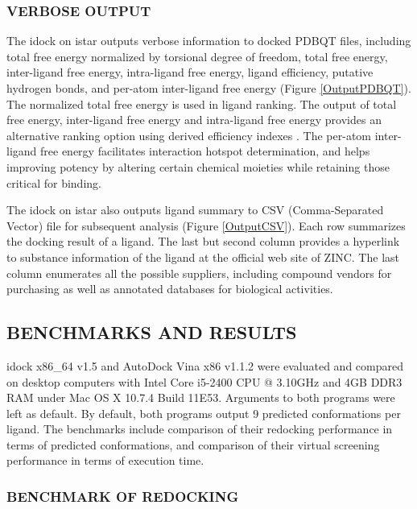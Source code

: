 \documentclass[12pt]{article}
\begin{document}
\subsubsection*{\sffamily \normalsize VERBOSE OUTPUT}

The idock on istar outputs verbose information to docked PDBQT files, including total free energy normalized by torsional degree of freedom, total free energy, inter-ligand free energy, intra-ligand free energy, ligand efficiency, putative hydrogen bonds, and per-atom inter-ligand free energy (Figure \ref{OutputPDBQT}). The normalized total free energy is used in ligand ranking. The output of total free energy, inter-ligand free energy and intra-ligand free energy provides an alternative ranking option using derived efficiency indexes \citep{335,336,337}. The per-atom inter-ligand free energy facilitates interaction hotspot determination, and helps improving potency by altering certain chemical moieties while retaining those critical for binding.

The idock on istar also outputs ligand summary to CSV (Comma-Separated Vector) file for subsequent analysis (Figure \ref{OutputCSV}). Each row summarizes the docking result of a ligand. The last but second column provides a hyperlink to substance information of the ligand at the official web site of ZINC. The last column enumerates all the possible suppliers, including compound vendors for purchasing as well as annotated databases for biological activities.

\subsection*{\sffamily \large BENCHMARKS AND RESULTS}

idock x86\_64 v1.5 and AutoDock Vina x86 v1.1.2 were evaluated and compared on desktop computers with Intel Core i5-2400 CPU @ 3.10GHz and 4GB DDR3 RAM under Mac OS X 10.7.4 Build 11E53. Arguments to both programs were left as default. By default, both programs output 9 predicted conformations per ligand. The benchmarks include comparison of their redocking performance in terms of predicted conformations, and comparison of their virtual screening performance in terms of execution time.

\subsubsection*{\sffamily \normalsize BENCHMARK OF REDOCKING}
\end{document}

